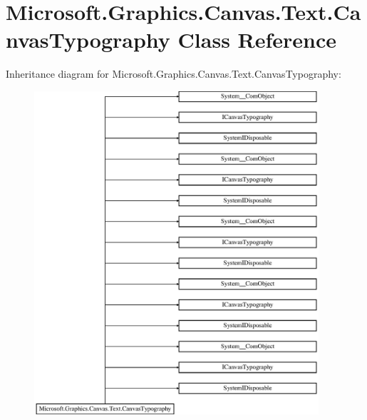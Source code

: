 \hypertarget{class_microsoft_1_1_graphics_1_1_canvas_1_1_text_1_1_canvas_typography}{}\section{Microsoft.\+Graphics.\+Canvas.\+Text.\+Canvas\+Typography Class Reference}
\label{class_microsoft_1_1_graphics_1_1_canvas_1_1_text_1_1_canvas_typography}
Inheritance diagram for Microsoft.\+Graphics.\+Canvas.\+Text.\+Canvas\+Typography\+:\begin{figure}[H]
\begin{center}
\leavevmode
\includegraphics[height=12.000000cm]{class_microsoft_1_1_graphics_1_1_canvas_1_1_text_1_1_canvas_typography}
\end{center}
\end{figure}
